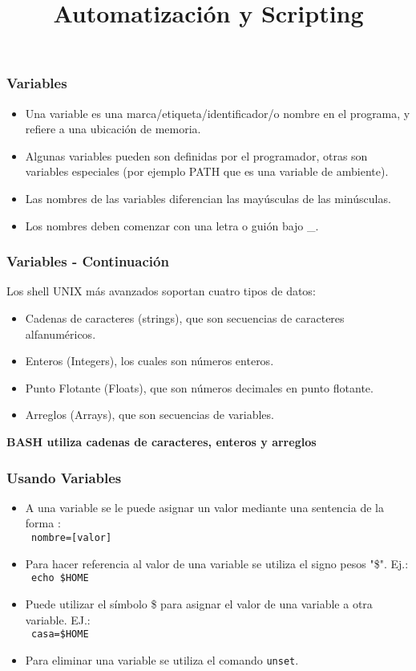 \documentclass{beamer}
\title{Automatización y Scripting}
\begin{document}
\begin{frame}
  \titlepage

\end{frame}





\begin{frame}{}
\frametitle{Variables}
\begin{itemize}
\item Una variable es una marca/etiqueta/identificador/o nombre en el programa, y refiere a una ubicación de memoria.

\item Algunas variables pueden son definidas por el programador, otras son variables especiales (por ejemplo PATH que es una variable de ambiente).
\item Las nombres de las variables diferencian las mayúsculas de las minúsculas.
\item Los nombres deben comenzar con una letra o guión bajo \_.
\end{itemize}

\end{frame}


\begin{frame}{}
\frametitle{Variables - Continuación}
Los shell UNIX más avanzados soportan cuatro tipos de datos:
\begin{itemize}
\item Cadenas de caracteres (strings), que son secuencias de caracteres alfanuméricos. 
\item Enteros (Integers), los cuales son números enteros.
\item Punto Flotante (Floats), que son números decimales en punto flotante. 
\item Arreglos (Arrays), que son secuencias de variables.
\end{itemize}
\textbf{BASH utiliza cadenas de caracteres, enteros y arreglos}
\end{frame}{}

\begin{frame}{}
\frametitle{Usando Variables}
\begin{itemize}
\item       A  una  variable se le puede asignar un valor mediante una sentencia de
       la forma :\\ 
             \texttt{        nombre=[valor]}
\item Para hacer referencia al valor de una variable se utiliza el signo pesos "\$". Ej.:\\
             \texttt{        echo \$HOME}
\item Puede utilizar el símbolo \$ para asignar el valor de una variable a otra variable. EJ.:\\
             \texttt{        casa=\$HOME}
\item Para eliminar una variable se utiliza el comando \texttt{unset}. 

\end{itemize}
\end{frame}{}
\end{document}
